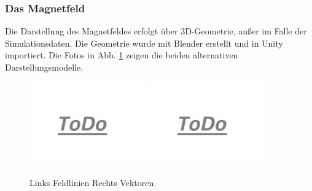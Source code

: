 \subsubsection{Das Magnetfeld}
Die Darstellung des Magnetfeldes erfolgt über 3D-Geometrie, außer im Falle der Simulationsdaten. Die Geometrie wurde mit Blender erstellt und in Unity importiert. Die Fotos in Abb. \ref{img:mfield-result} zeigen die beiden alternativen Darstellungsmodelle.

\begin{figure}[H]
	\centering
	\includegraphics[width=0.45\textwidth]{images/todo.jpg}
	\hspace{0.05cm}	
	\includegraphics[width=0.45\textwidth]{images/todo.jpg}
	\caption{Links Feldlinien Rechts Vektoren}
	\label{img:mfield-result}
\end{figure}

